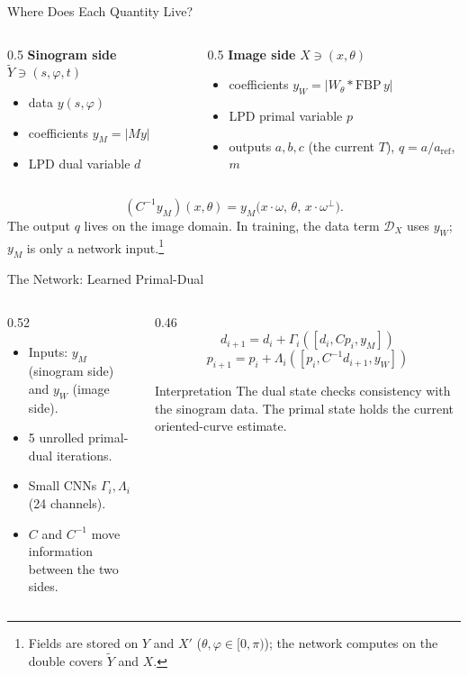 \documentclass[aspectratio=169]{beamer}
\newcommand{\tY}{\tilde Y}
\begin{document}
\begin{frame}{Where Does Each Quantity Live?}
  \begin{columns}[T]
    \begin{column}{0.5\linewidth}
      \textbf{Sinogram side} $\tY\ni(s,\varphi,t)$
      \begin{itemize}
        \item data $y(s,\varphi)$
        \item coefficients $y_M=|My|$
        \item LPD dual variable $d$
      \end{itemize}
    \end{column}
    \begin{column}{0.5\linewidth}
      \textbf{Image side} $X\ni(x,\theta)$
      \begin{itemize}
        \item coefficients $y_W=|W_\theta*\mathrm{FBP}\,y|$
        \item LPD primal variable $p$
        \item outputs $a,b,c$ (the current $T$), $q=a/a_\mathrm{ref}$, $m$
      \end{itemize}
    \end{column}
  \end{columns}
  \vspace{0.6em}
  \[
    (C^{-1}y_M)(x,\theta)=y_M\bigl(x\cdot\omega,\,\theta,\,x\cdot\omega^\perp\bigr).
  \]
  The output $q$ lives on the image domain. In training, the data term $\mathcal D_X$ uses $y_W$; $y_M$ is only a network input.\footnote{Fields are stored on $Y$ and $X'$ ($\theta,\varphi\in[0,\pi)$); the network computes on the double covers $\tY$ and $X$.}
\end{frame}

\begin{frame}{The Network: Learned Primal-Dual}
  \begin{columns}[T]
    \begin{column}{0.52\linewidth}
      \begin{itemize}
        \item Inputs: $y_M$ (sinogram side) and $y_W$ (image side).
        \item 5 unrolled primal-dual iterations.
        \item Small CNNs $\Gamma_i,\Lambda_i$ (24 channels).
        \item $C$ and $C^{-1}$ move information between the two sides.
      \end{itemize}
    \end{column}
    \begin{column}{0.46\linewidth}
      \[
      d_{i+1}=d_i+\Gamma_i([d_i,Cp_i,y_M])
      \]
      \[
      p_{i+1}=p_i+\Lambda_i([p_i,C^{-1}d_{i+1},y_W])
      \]
      \vspace{0.4em}
      \begin{block}{Interpretation}
      The dual state checks consistency with the sinogram data. The primal state holds the current oriented-curve estimate.
      \end{block}
    \end{column}
  \end{columns}
\end{frame}
\end{document}
